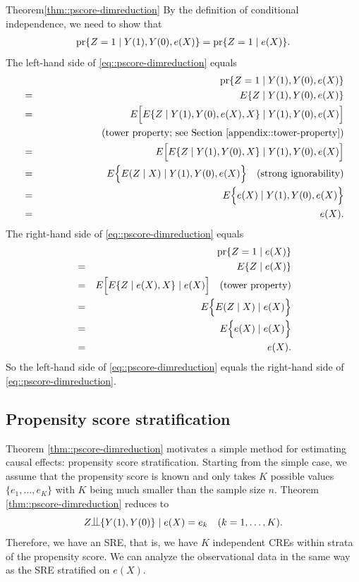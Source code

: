 \begin{myproof}{Theorem}{\ref{thm::pscore-dimreduction}}
By the definition of conditional independence, we need to show that 
\begin{eqnarray}
\pr\{ Z=1\mid Y(1), Y(0), e(X)  \} = \pr\{ Z=1\mid e(X)  \} .
\label{eq::pscore-dimreduction}
\end{eqnarray}
The left-hand side of \eqref{eq::pscore-dimreduction} equals
\begin{eqnarray*}
&&\textup{pr}\{ Z=1\mid Y(1), Y(0), e(X)  \}  \\
&=& E\{ Z \mid Y(1), Y(0), e(X)  \}  \\
&=& E\Big[   E\{ Z \mid Y(1), Y(0), e(X) , X  \}  \mid   Y(1), Y(0), e(X)    \Big]  \\
&&\quad  \quad  \quad  \quad   \quad \quad \text{(tower property; see Section \ref{appendix::tower-property})} \\
&=& E\Big[   E\{ Z \mid Y(1), Y(0),   X  \}  \mid   Y(1), Y(0), e(X)    \Big]  \\
&=& E\Big\{    E(Z \mid  X  )  \mid   Y(1), Y(0), e(X)    \Big\}  \quad \text{(strong ignorability)} \\
&=& E\Big\{   e(X) \mid   Y(1), Y(0), e(X)    \Big\} \\
&=& e(X).
\end{eqnarray*}
The right-hand side of \eqref{eq::pscore-dimreduction} equals 
\begin{eqnarray*}
&& \textup{pr}\{ Z=1\mid e(X)  \} \\
  &=&  E\{ Z \mid e(X)  \} \\
 &=& E\Big[   E\{ Z \mid e(X), X  \}  \mid e(X)  \Big ] \quad \text{(tower property)} \\
 &=& E\Big\{    E( Z \mid  X )  \mid e(X)  \Big \}   \\
 &=& E\Big\{   e(X)  \mid e(X)  \Big \} \\
 &=& e(X). 
\end{eqnarray*}
So the left-hand side of \eqref{eq::pscore-dimreduction} equals the right-hand side of \eqref{eq::pscore-dimreduction}. 
\end{myproof}


\subsection{Propensity score stratification}
\label{sec::pscore-stratification}




Theorem \ref{thm::pscore-dimreduction} motivates a simple method for estimating causal effects: propensity score stratification. 
Starting from the simple case, we assume that the propensity score is known and only takes $K$ possible values $\{ e_1,\ldots, e_K \}$ with $K$ being much smaller than the sample size $n$. Theorem \ref{thm::pscore-dimreduction} reduces to
$$
Z\ind \{ Y(1), Y(0)  \} \mid e(X) = e_k  \quad (k=1,\ldots, K).
$$
Therefore, we have an SRE, that is, we have $K$ independent CREs within strata of the propensity score. We can analyze the observational data in the same way as the SRE stratified on $e(X)$. 


